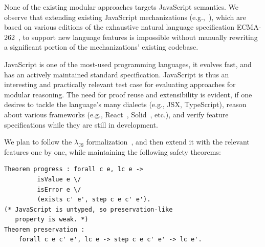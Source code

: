 \documentclass[sigplan,nonacm,review]{acmart}
\begin{document}

None of the existing modular approaches targets JavaScript semantics.
We observe that extending existing JavaScript mechanizations (e.g.,~\cite{guha2010essence,bodin2014trusted}), which are based on various editions of the exhaustive natural language specification ECMA-262~\cite{ECMA},
to support new language features
is impossible without manually rewriting a significant portion of the mechanizations' existing codebase.


JavaScript is one of the most-used programming languages, it evolves fast, and has an actively maintained standard specification. JavaScript is thus an interesting and practically relevant test case for evaluating approaches for modular reasoning. The need for proof reuse and extensibility is evident, if one desires to tackle the language's many dialects (e.g., JSX, TypeScript), reason about various frameworks (e.g., React~\cite{React}, Solid~\cite{Solid}, etc.), and verify feature specifications while they are still in development. 



We plan to follow the $\lambda_{\texttt{JS}}$ formalization~\cite{guha2010essence},
and then extend it with the relevant features one by one,
while maintaining the following safety theorems:


\begin{lstlisting}[numbers=none, language=Coq]
Theorem progress : forall c e, lc e -> 
         isValue e \/ 
         isError e \/ 
         (exists c' e', step c e c' e').
(* JavaScript is untyped, so preservation-like 
   property is weak. *)
Theorem preservation : 
    forall c e c' e', lc e -> step c e c' e' -> lc e'.
\end{lstlisting}
\end{document}
